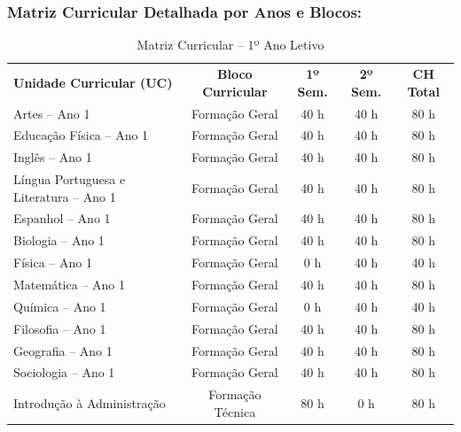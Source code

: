 
\subsubsection{Matriz Curricular Detalhada por Anos e Blocos:}

\begin{table}[H]
\centering
\small
\caption{Matriz Curricular -- 1º Ano Letivo}
\label{qua:matriz-ano1}
\vspace{0.2cm}
\begin{tabularx}{\linewidth}{|X|c|c|c|c|}
\hline
\rowcolor{ifscgreen!20}
\multicolumn{5}{|c|}{\textbf{\large 1º ANO LETIVO (SEMESTRES 1 E 2)}} \\ \hline
\rowcolor{cinzaTabela}
\textbf{Unidade Curricular (UC)} & \textbf{Bloco Curricular} & \textbf{1º Sem.} & \textbf{2º Sem.} & \textbf{CH Total} \\ \hline
Artes -- Ano 1 & Formação Geral & 40 h & 40 h & 80 h \\ \hline
Educação Física -- Ano 1 & Formação Geral & 40 h & 40 h & 80 h \\ \hline
Inglês -- Ano 1 & Formação Geral & 40 h & 40 h & 80 h \\ \hline
Língua Portuguesa e Literatura -- Ano 1 & Formação Geral & 40 h & 40 h & 80 h \\ \hline
Espanhol -- Ano 1\revisao{*} & Formação Geral & 40 h & 40 h & 80 h \\ \hline
Biologia -- Ano 1 & Formação Geral & 40 h & 40 h & 80 h \\ \hline
Física -- Ano 1 & Formação Geral & 0 h & 40 h & 40 h \\ \hline
Matemática -- Ano 1 & Formação Geral & 40 h & 40 h & 80 h \\ \hline
Química -- Ano 1 & Formação Geral & 0 h & 40 h & 40 h \\ \hline
Filosofia -- Ano 1 & Formação Geral & 40 h & 40 h & 80 h \\ \hline
Geografia -- Ano 1 & Formação Geral & 40 h & 40 h & 80 h \\ \hline
Sociologia -- Ano 1 & Formação Geral & 40 h & 40 h & 80 h \\ \hline
Introdução à Administração & Formação Técnica & 80 h & 0 h & 80 h \\ \hline

\end{tabularx}
\end{table}
